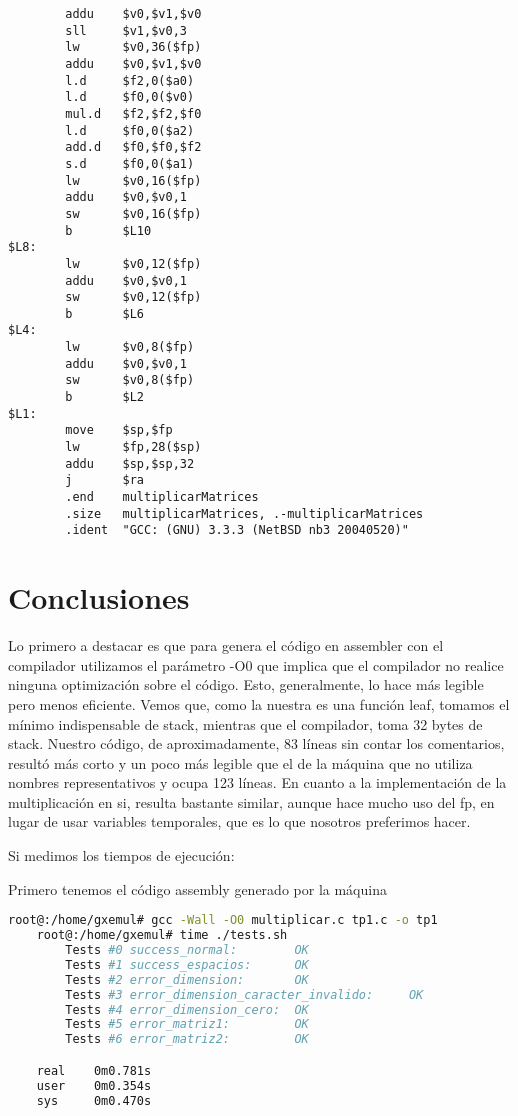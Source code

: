 \documentclass[a4paper,10pt]{article}
\begin{document}
\begin{lstlisting}
        addu    $v0,$v1,$v0
        sll     $v1,$v0,3
        lw      $v0,36($fp)
        addu    $v0,$v1,$v0
        l.d     $f2,0($a0)
        l.d     $f0,0($v0)
        mul.d   $f2,$f2,$f0
        l.d     $f0,0($a2)
        add.d   $f0,$f0,$f2
        s.d     $f0,0($a1)
        lw      $v0,16($fp)
        addu    $v0,$v0,1
        sw      $v0,16($fp)
        b       $L10
$L8:
        lw      $v0,12($fp)
        addu    $v0,$v0,1
        sw      $v0,12($fp)
        b       $L6
$L4:
        lw      $v0,8($fp)
        addu    $v0,$v0,1
        sw      $v0,8($fp)
        b       $L2
$L1:
        move    $sp,$fp
        lw      $fp,28($sp)
        addu    $sp,$sp,32
        j       $ra
        .end    multiplicarMatrices
        .size   multiplicarMatrices, .-multiplicarMatrices
        .ident  "GCC: (GNU) 3.3.3 (NetBSD nb3 20040520)"
\end{lstlisting}
\section{Conclusiones}
Lo primero a destacar es que para genera el c\'odigo en assembler con el compilador utilizamos el par\'ametro -O0 que implica que el compilador no realice ninguna optimizaci\'on sobre el c\'odigo. Esto, generalmente, lo hace m\'as legible pero menos eficiente.
Vemos que, como la nuestra es una funci\'on leaf, tomamos el m\'inimo indispensable de stack, mientras que el compilador, toma 32 bytes de stack.
Nuestro c\'odigo, de aproximadamente, 83 l\'ineas sin contar los comentarios, result\'o m\'as corto y un poco m\'as legible que el de la m\'aquina que no utiliza nombres representativos y ocupa 123 l\'ineas.
En cuanto a la implementaci\'on de la multiplicaci\'on en si, resulta bastante similar, aunque hace mucho uso del fp, en lugar de usar variables temporales, que es lo que nosotros preferimos hacer.

Si medimos los tiempos de ejecuci\'on:

Primero tenemos el c\'odigo assembly generado por la m\'aquina

\begin{lstlisting}[language=bash]
	root@:/home/gxemul# gcc -Wall -O0 multiplicar.c tp1.c -o tp1
	root@:/home/gxemul# time ./tests.sh 
		Tests #0 success_normal:        OK
		Tests #1 success_espacios:      OK
		Tests #2 error_dimension:       OK
		Tests #3 error_dimension_caracter_invalido:     OK
		Tests #4 error_dimension_cero:  OK
		Tests #5 error_matriz1:         OK
		Tests #6 error_matriz2:         OK

	real    0m0.781s
	user    0m0.354s
	sys     0m0.470s
\end{lstlisting}
\end{document}
